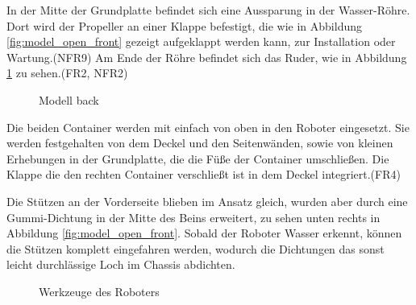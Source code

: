 In der Mitte der Grundplatte befindet sich eine Aussparung in der Wasser-Röhre.
Dort wird der Propeller an einer Klappe befestigt,
die wie in Abbildung \ref{fig:model_open_front} gezeigt
aufgeklappt werden kann, 
zur Installation oder Wartung.(NFR9)
Am Ende der Röhre befindet sich das Ruder, 
wie in Abbildung \ref{fig:model_open_back} zu sehen.(FR2, NFR2)

\begin{figure}[H]
  \caption{Modell back}
  \label{fig:model_open_back}
\end{figure}

Die beiden Container werden mit einfach von oben in den Roboter eingesetzt.
Sie werden festgehalten von dem Deckel und den Seitenwänden,
sowie von kleinen Erhebungen in der Grundplatte,
die die Füße der Container umschließen.
Die Klappe die den rechten Container verschließt ist in dem Deckel integriert.(FR4)

Die Stützen an der Vorderseite blieben im Ansatz gleich,
wurden aber durch eine Gummi-Dichtung in der Mitte des Beins erweitert,
zu sehen unten rechts in Abbildung \ref{fig:model_open_front}.
Sobald der Roboter Wasser erkennt, 
können die Stützen komplett eingefahren werden,
wodurch die Dichtungen das sonst leicht durchlässige Loch im Chassis abdichten.

\begin{figure}[H]
  \caption{Werkzeuge des Roboters}
  \label{fig:model_closeup}
\end{figure}

